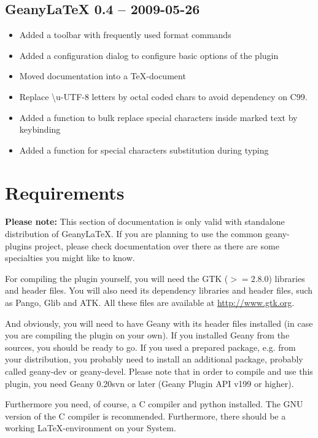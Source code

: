 \documentclass[%
paper=a4,%
fontsize=11pt,%
twoside=false,%
DIV18,%
headsepline,%
plainheadsepline,%
footsepline,%
plainfootsepline,%
bibliography=totoc,%
listof=totoc,%
BCOR10mm,%
parskip=half,%
openany,%
]{scrartcl}
\begin{document}
\subsection{Geany\LaTeX{} 0.4 -- 2009-05-26}
\begin{itemize}
	\item Added a toolbar with frequently used format commands
	\item Added a configuration dialog to configure basic options
          of the plugin
	\item Moved documentation into a \TeX{}-document
	\item Replace \textbackslash{}u-UTF-8 letters by octal coded
          chars to avoid dependency on C99.
	\item Added a function to bulk replace special characters
          inside marked text by keybinding
	\item Added a function for special characters substitution during typing
\end{itemize}

\newpage
\section{Requirements}

\small{\textbf{Please note:} This section of documentation is only
valid with standalone distribution of Geany\LaTeX{}. If you are
planning to use the common geany-plugins project, please check
documentation over there as there are some specialties you might
like to know.}

For compiling the plugin yourself, you will need the GTK ($>= 2.8.0$)
libraries and header files. You will also need its dependency
libraries and header files, such as Pango, Glib and ATK. All these
files are available at \url{http://www.gtk.org}.

And obviously, you will need to have Geany with its header files
installed (in case you are compiling the plugin on your own). If you
installed Geany from the sources, you should be ready to go. If
you used a prepared package, e.g. from your distribution, you probably
need to install an additional package, probably called geany-dev
or geany-devel. Please note that in order to compile and use this
plugin, you need Geany 0.20svn or later (Geany Plugin API v199 or higher).

Furthermore you need, of course, a C compiler and python installed. The
GNU version of the C compiler is recommended. Furthermore, there should be a
working \LaTeX-environment on your System.
\end{document}
